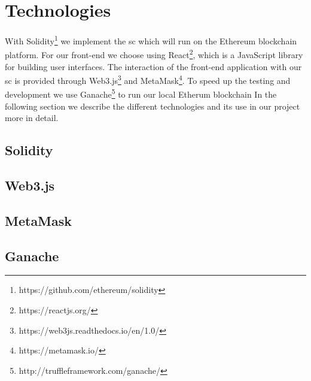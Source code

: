 \chapter{Technologies}\label{ch:technologies}
With Solidity\footnote{https://github.com/ethereum/solidity} we implement the \ac{sc} which will run on the Ethereum blockchain platform. For our front-end we choose using React\footnote{https://reactjs.org/}, which is a JavaScript library for building user interfaces. The interaction of the front-end application with our \ac{sc} is provided through Web3.js\footnote{https://web3js.readthedocs.io/en/1.0/} and MetaMask\footnote{https://metamask.io/}. To speed up the testing and development we use Ganache\footnote{http://truffleframework.com/ganache/} to run our local Etherum blockchain
In the following section we describe the different technologies and its use in our project more in detail.
\section{Solidity}
\section{Web3.js}
\section{MetaMask}
\section{Ganache}
